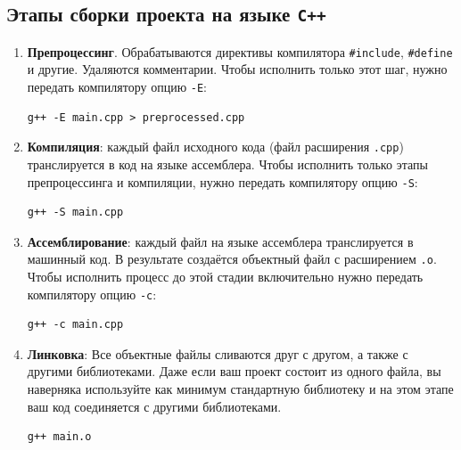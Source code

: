 \documentclass{article}
\begin{document}
\subsection*{Этапы сборки проекта на языке \texttt{C++}}
\begin{enumerate}
\item \textbf{Препроцессинг}. Обрабатываются директивы компилятора \texttt{\#include}, \texttt{\#define} и другие. Удаляются комментарии. Чтобы исполнить только этот шаг, нужно передать компилятору опцию \texttt{-E}:
\begin{verbatim}
g++ -E main.cpp > preprocessed.cpp
\end{verbatim}
\item \textbf{Компиляция}: каждый файл исходного кода (файл расширения \texttt{.cpp}) транслируется в код на языке ассемблера. Чтобы исполнить только этапы препроцессинга и компиляции, нужно передать компилятору опцию \texttt{-S}:
\begin{verbatim}
g++ -S main.cpp
\end{verbatim}
\item \textbf{Ассемблирование}: каждый файл на языке ассемблера транслируется в машинный код. В результате создаётся объектный файл с расширением \texttt{.o}. Чтобы исполнить процесс до этой стадии включительно нужно передать компилятору опцию \texttt{-c}:
\begin{verbatim}
g++ -c main.cpp
\end{verbatim}
\item \textbf{Линковка}: Все объектные файлы сливаются друг с другом, а также с другими библиотеками. Даже если ваш проект состоит из одного файла, вы наверняка используйте как минимум стандартную библиотеку и на этом этапе ваш код соединяется с другими библиотеками.
\begin{verbatim}
g++ main.o
\end{verbatim}
\end{enumerate}
\end{document}
